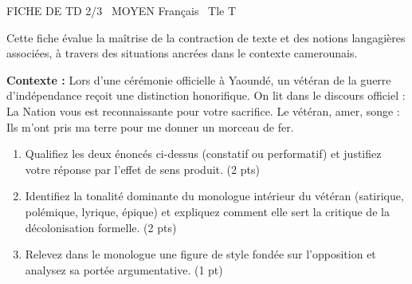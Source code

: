 \documentclass[11pt]{article}
\begin{document}
\begin{tcolorbox}[enhanced,colback=popink,colframe=popink,arc=10pt,boxrule=0pt,left=12pt,right=12pt,top=9pt,bottom=9pt]
{\color{white}\popxbold\small FICHE DE TD 2/3 \textbullet\ MOYEN \hfill Français \textbullet\ Tle T\par}
\end{tcolorbox}
\vspace{4pt}
Cette fiche évalue la maîtrise de la contraction de texte et des notions langagières associées, à travers des situations ancrées dans le contexte camerounais.

\begin{exercice}
\textbf{Contexte :} Lors d'une cérémonie officielle à Yaoundé, un vétéran de la guerre d'indépendance reçoit une distinction honorifique. On lit dans le discours officiel : \og La Nation vous est reconnaissante pour votre sacrifice. \fg{} Le vétéran, amer, songe : \og Ils m'ont pris ma terre pour me donner un morceau de fer. \fg

\begin{enumerate}
    \item Qualifiez les deux énoncés ci-dessus (constatif ou performatif) et justifiez votre réponse par l'effet de sens produit. (2 pts)
    \item Identifiez la tonalité dominante du monologue intérieur du vétéran (satirique, polémique, lyrique, épique) et expliquez comment elle sert la critique de la décolonisation formelle. (2 pts)
    \item Relevez dans le monologue une figure de style fondée sur l'opposition et analysez sa portée argumentative. (1 pt)
\end{enumerate}
\end{exercice}
\end{document}
